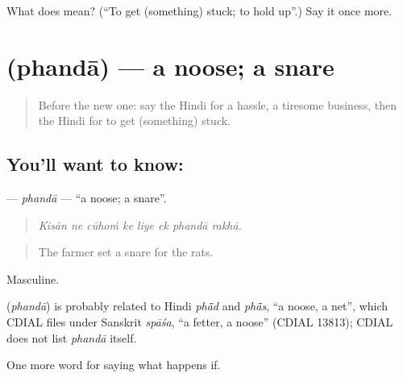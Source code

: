 \begin{tcolorbox}[breakable,colback=teal!4,colframe=teal!35!black,title={Before you move on}]
What does  mean? (\textquotedblleft{}To get (something) stuck; to hold up\textquotedblright{}.) Say it once more.
\end{tcolorbox}
\section[\texorpdfstring{\hi{फंदा} (phandā)}{फंदा (phandā)}]{ (phandā) — a noose; a snare}

\label{lesson:HI-C541-phanda}



\begin{quote}
Before the new one: say the Hindi for a hassle, a tiresome business, then the Hindi for to get (something) stuck.
\end{quote}

\subsection*{You'll want to know: }
\textbf{} — \emph{phandā} — \textquotedblleft{}a noose; a snare\textquotedblright{}.

\begin{quote}
       
\end{quote}

\begin{quote}
\emph{Kisān ne cūhoṁ ke liye ek phandā rakhā.}
\end{quote}

\begin{quote}
The farmer set a snare for the rats.
\end{quote}

Masculine.

\begin{cousinweb}
\textbf{} (\emph{phandā}) is probably related to Hindi \emph{phā̃d} and \emph{phā̃s}, \textquotedblleft{}a noose, a net\textquotedblright{}, which CDIAL files under Sanskrit \emph{spāśa}, \textquotedblleft{}a fetter, a noose\textquotedblright{} (CDIAL 13813); CDIAL does not list \emph{phandā} itself.
\end{cousinweb}

\begin{grammarlens}[title={What you've built}]
One more word for saying what happens if.
\end{grammarlens}


